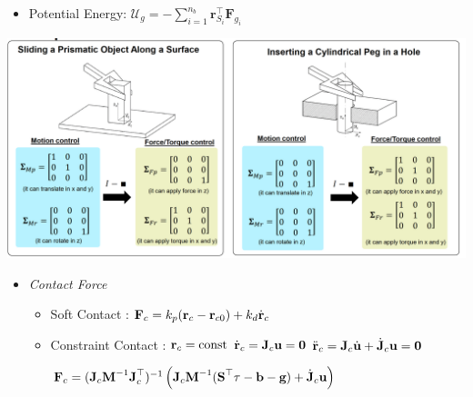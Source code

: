 \documentclass[landscape,a0paper,fontscale=0.285]{baposter} %
\newcommand{\compresslist}{ %
\setlength{\itemsep}{1pt}
\setlength{\parskip}{0pt}
\setlength{\parsep}{0pt}
}
\begin{document}
\begin{poster}
{\begin{minipage}[c]{0.475\textwidth}
\begin{itemize}
    $\mathcal{T}(\mathbf{q},\dot{\mathbf{q}}) = \frac{1}{2}\dot{\mathbf{q}}^\top\left(\sum_{i=1}^{n_b}(\mathbf{J}_{S_i}^\top m\mathbf{J}_{S_i} + \mathbf{J}_{R_i}^\top \Theta_{S_i}\mathbf{J}_{R_i})\right)\dot{\mathbf{q}}$
    \item Potential Energy: $\mathcal{U}_g = -\sum_{i=1}^{n_b} \mathbf{r}_{S_i}^\top \mathbf{F}_{g_i}$
    \end{itemize}
\end{minipage}

\includegraphics[width=\textwidth]{images/selection_matrix.png}


\colorbox[HTML]{CCFFFF}{}
\begin{itemize}\compresslist
    \item \textit{Contact Force}
    \begin{itemize}[label=$\circ$]\compresslist
        \item Soft Contact : $\textbf F_c = k_p (\textbf r_c - \textbf  r_{c0}) + k_d \dot{\textbf r}_c$
        \item Constraint Contact : $\textbf r_c = \text{const}$ $\dot{\textbf r}_c =\textbf J_c\textbf u = \textbf 0 $ $ \ddot{\textbf r}_c = \textbf J_c \dot{\textbf u}+\dot{\textbf J}_c\textbf u =  \textbf 0$

        $\textbf F_c = (\textbf J_c\textbf M^{-1}\textbf J_c^\top)^{-1}\left(\textbf J_c\textbf  M^{-1}(\textbf S^\top \tau -\textbf b-\textbf g) +  \dot{\textbf J}_c \textbf u\right)$
    \end{itemize}
\end{itemize}





}



\end{poster}
\end{document}
